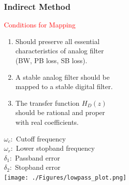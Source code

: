 \documentclass[mathserif, 10pt]{beamer} %
\begin{document}
\frame
{
\vspace{-.2in}
\normalsize
\frametitle{Indirect Method}

\textcolor{red}{Conditions for Mapping}\\
\begin{enumerate}
	\item Should preserve all essential \\characteristics of analog filter \\(BW, PB loss, SB loss).
	\item A stable analog filter should be \\mapped to a stable digital filter.
	\item The transfer function $H_D(z)$ \\should be rational and proper \\with real coefficients.
\end{enumerate}

$\omega_c:$ Cutoff frequency\\
$\omega_r:$  Lower stopband frequency\\
$\delta_1:$  Passband error\\
$\delta_2:$ Stopband error\\
\vspace{-2.1in}
\hspace{2.2in}
\texttt{[image: ./Figures/lowpass\_plot.png]}

}
\end{document}

